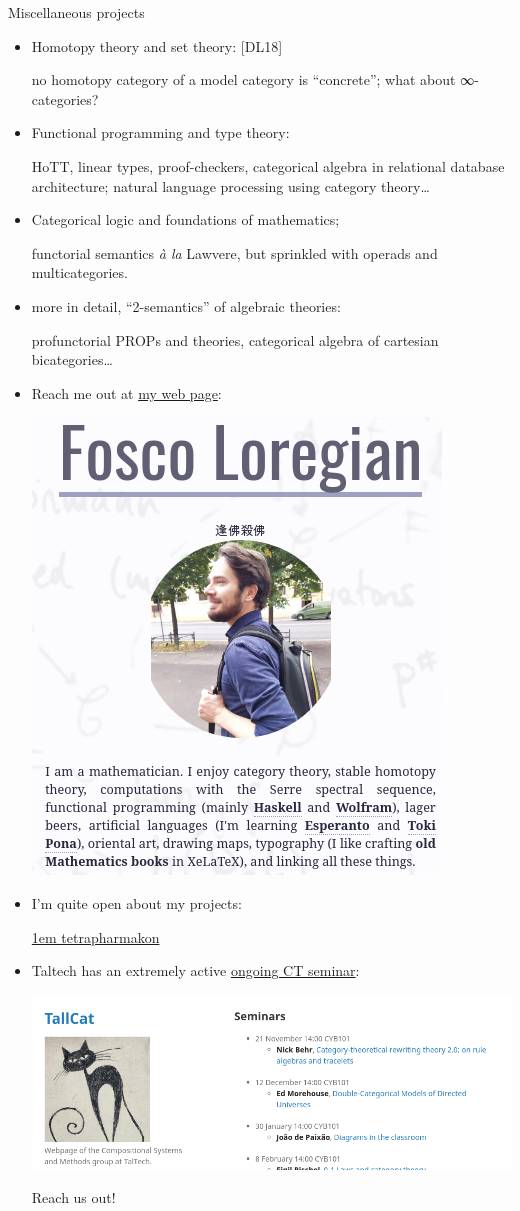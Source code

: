 \documentclass{beamer}
\def\lnk#1{\href{#1}{\faFilePdfO}}
\begin{document}
\begin{frame}{Miscellaneous projects}
\small
\begin{itemize}
  \item<+-> Homotopy theory and set theory: [\alert{DL18}\lnk{https://link.springer.com/article/10.1007/s40062-018-0197-3}]
  
  {\color{gray!70}\footnotesize  no homotopy category of a model category is ``concrete''; what about ∞-categories?}
  \item<+-> Functional programming and type theory:
  
  {\color{gray!70}\footnotesize  HoTT, linear types, proof-checkers, categorical algebra in relational database architecture; natural language processing using category theory\dots}
  \item<+-> Categorical logic and foundations of mathematics;
  
  {\color{gray!70}\footnotesize  functorial semantics \emph{à la} Lawvere, but sprinkled with operads and multicategories.}
  \item<+-> more in detail, ``2-semantics'' of algebraic theories: 
  
  {\color{gray!70}\footnotesize profunctorial PROPs and theories, categorical algebra of cartesian bicategories\dots}
\end{itemize}
\end{frame}
%
\begin{frame}
\begin{itemize}
\item Reach me out at \href{http://tetrapharmakon.github.io}{my web page}:
\begin{center}
\href{http://tetrapharmakon.github.io}{
\includegraphics[width=.25\textwidth]{crop1.png}
}
\end{center}
\item I'm quite open about my projects:
\begin{center}
  \href{https://github.com/tetrapharmakon}{\faGithub \kern1em tetrapharmakon}
\end{center}
\item Taltech has an extremely active \href{https://compose.ioc.ee}{ongoing CT seminar}:
\begin{center}
\href{https://compose.ioc.ee}{
\includegraphics[width=.3\textwidth]{crop2.png}
}
\end{center}
Reach us out!
\end{itemize}
\end{frame}
%
%
%
%
%
\end{document}

